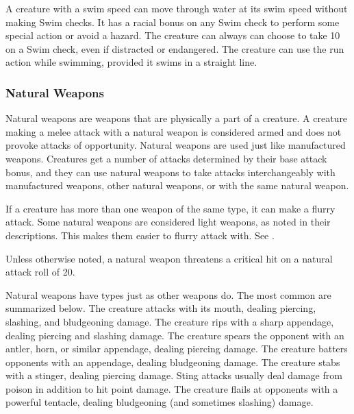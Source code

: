 { A creature with a swim speed can move through water at its swim speed without making Swim checks. It has a  racial bonus on any Swim check to perform some special action or avoid a hazard. The creature can always can choose to take 10 on a Swim check, even if distracted or endangered. The creature can use the run action while swimming, provided it swims in a straight line. 

\subsubsection{Natural Weapons} Natural weapons are weapons that are physically a part of a creature. A creature making a melee attack with a natural weapon is considered armed and does not provoke attacks of opportunity. Natural weapons are used just like manufactured weapons. Creatures get a number of attacks determined by their base attack bonus, and they can use natural weapons to take attacks interchangeably with manufactured weapons, other natural weapons, or with the same natural weapon.

If a creature has more than one weapon of the same type, it can make a flurry attack. Some natural weapons are considered light weapons, as noted in their descriptions. This makes them easier to flurry attack with. See .

Unless otherwise noted, a natural weapon threatens a critical hit on a natural attack roll of 20.

Natural weapons have types just as other weapons do. The most common are summarized below.
 The creature attacks with its mouth, dealing piercing, slashing, and bludgeoning damage.
 The creature rips with a sharp appendage, dealing piercing and slashing damage.
 The creature spears the opponent with an antler, horn, or similar appendage, dealing piercing damage.
 The creature batters opponents with an appendage, dealing bludgeoning damage.
 The creature stabs with a stinger, dealing piercing damage. Sting attacks usually deal damage from poison in addition to hit point damage.
 The creature flails at opponents with a powerful tentacle, dealing bludgeoning (and sometimes slashing) damage. 

}

